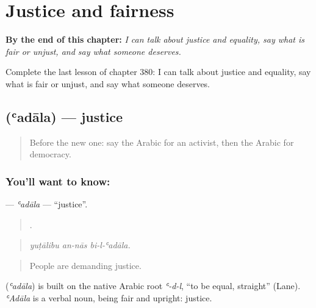 
\chapter{Justice and fairness}
\label{ch:ar-justice-and-fairness}

\begin{chapteropening}
\textbf{By the end of this chapter:} \emph{I can talk about justice and equality, say what is fair or unjust, and say what someone deserves.}

Complete the last lesson of chapter 380: I can talk about justice and equality, say what is fair or unjust, and say what someone deserves.
\end{chapteropening}

\section[\texorpdfstring{\ar{عدالة} (ʿadāla)}{عدالة (ʿadāla)}]{ (ʿadāla) — justice}

\label{lesson:AR-C380-adala}



\begin{quote}
Before the new one: say the Arabic for an activist, then the Arabic for democracy.
\end{quote}

\subsection*{You'll want to know: }
\textbf{} — \emph{ʿadāla} — \textquotedblleft{}justice\textquotedblright{}.

\begin{quote}
  .
\end{quote}

\begin{quote}
\emph{yuṭālibu an-nās bi-l-ʿadāla.}
\end{quote}

\begin{quote}
People are demanding justice.
\end{quote}

\begin{cousinweb}
\textbf{} (\emph{ʿadāla}) is built on the native Arabic root \emph{ʿ-d-l}, \textquotedblleft{}to be equal, straight\textquotedblright{} (Lane). \emph{ʿAdāla} is a verbal noun, being fair and upright: justice.
\end{cousinweb}

